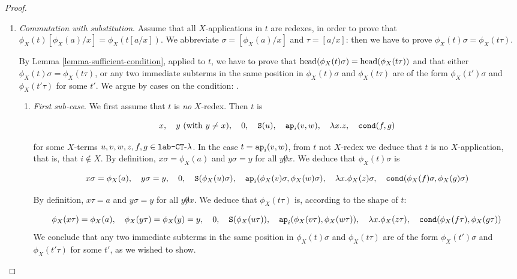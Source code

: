 \begin{proof}
\begin{enumerate}
\item
\emph{Commutation with substitution}.
Assume that all $X$-applications in $t$ are redexes, 
in order to prove that $\phi_{X}(t)[\phi_{X}(a)/x]= \phi_{X}(t[a/x])$.
We abbreviate $\sigma=[\phi_{X}(a)/x]$ and $\tau = [a/x]$: 
then we have to prove $\phi_{X}(t)\sigma= \phi_{X}(t\tau)$.

By Lemma \ref{lemma-sufficient-condition}, applied to $t$, we have to prove that
${\rm head}( \phi_{X}(t)\sigma ) = {\rm head}( \phi_{X}(t\tau) )$ 
and that either $\phi_{X}(t)\sigma= \phi_{X}(t\tau)$, or any two immediate subterms
in the same position in $\phi_{X}(t)\sigma$ and $\phi_{X}(t\tau)$ 
are of the form $\phi_{X}(t')\sigma$ and $\phi_{X}(t'\tau)$ for some $t'$.
We argue by cases on the condition: \emph{}.

\begin{enumerate}

\item
\emph{First sub-case}.
We first assume that $t$ is \emph{no} $X$-redex. Then $t$ is

$$ 
x, \ \ \ 
y \   (\mbox{with $y\not = x$}), \ \ \  
0, \ \ \  
\Succ(u),  \ \ \  
\ap_i(v,w), \ \ \  
\lambda x.z, \ \ \  
\cond(f,g)
$$

for some $X$-terms $u,v,w,z,f,g \in {\mbox{\tt lab-} { {\tt CT}\mbox{-}\lambda} }$.
In the case $t = {\tt ap}_i(v,w)$, from $t$ not $X$-redex we deduce that $t$ is no
$X$-application, that is, that $i \not \in X$. By definition, $x \sigma = \phi_{X}(a)$
and $y \sigma =y$ for all  $y\not 0 x$.
We deduce that $\phi_{X}(t)\sigma$ is

$$ 
x \sigma = \phi_{X}(a), \ \ \ 
y \sigma = y, \ \ \  
0, \ \ \  
\Succ(\phi_X(u)\sigma),  \ \ \  
\ap_i(\phi_X(v)\sigma, \phi_X(w)\sigma), \ \ \  
\lambda x.\phi_X(z)\sigma, \ \ \  
\cond(\phi_X(f)\sigma, \phi_X(g)\sigma)
$$

By definition, $x \tau = a$
and $y \sigma =y$ for all  $y\not 0 x$.
We deduce that  $\phi_{X}(t\tau)$ is, according to the shape of $t$:

$$ 
\phi_{X}(x \tau) = \phi_{X}(a),   \ \ \ 
\phi_{X}(y \tau) = \phi_{X}(y) = y,   \ \ \  
0,   \ \ \  
\Succ(\phi_{X}(u\tau)),    \ \ \  
\ap_i(   \phi_{X}(v\tau),    \phi_{X}(w\tau)   ), \ \ \  
\lambda x.\phi_{X}(z\tau),    \ \ \  
\cond(    \phi_{X}(f\tau),     \phi_{X}(g\tau)    )
$$
We conclude that any two immediate subterms
in the same position in $\phi_{X}(t)\sigma$ and $\phi_{X}(t\tau)$ 
are of the form $\phi_{X}(t')\sigma$ and $\phi_{X}(t'\tau)$ for some $t'$, as we wished to show.


\end{enumerate}
\end{enumerate}
\end{proof}
